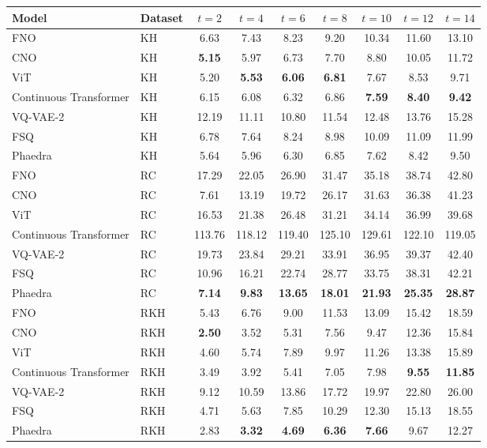 \begin{tabular}{llccccccc}
\toprule
Model & Dataset & $t=2$ & $t=4$ & $t=6$ & $t=8$ & $t=10$ & $t=12$ & $t=14$ \\
\midrule
FNO & KH & 6.63 & 7.43 & 8.23 & 9.20 & 10.34 & 11.60 & 13.10 \\
CNO & KH & \textbf{5.15} & 5.97 & 6.73 & 7.70 & 8.80 & 10.05 & 11.72 \\
ViT & KH & 5.20 & \textbf{5.53} & \textbf{6.06} & \textbf{6.81} & 7.67 & 8.53 & 9.71 \\
Continuous Transformer & KH & 6.15 & 6.08 & 6.32 & 6.86 & \textbf{7.59} & \textbf{8.40} & \textbf{9.42} \\
VQ-VAE-2 & KH & 12.19 & 11.11 & 10.80 & 11.54 & 12.48 & 13.76 & 15.28 \\
FSQ & KH & 6.78 & 7.64 & 8.24 & 8.98 & 10.09 & 11.09 & 11.99 \\
Phaedra & KH & 5.64 & 5.96 & 6.30 & 6.85 & 7.62 & 8.42 & 9.50 \\
\midrule
FNO & RC & 17.29 & 22.05 & 26.90 & 31.47 & 35.18 & 38.74 & 42.80 \\
CNO & RC & 7.61 & 13.19 & 19.72 & 26.17 & 31.63 & 36.38 & 41.23 \\
ViT & RC & 16.53 & 21.38 & 26.48 & 31.21 & 34.14 & 36.99 & 39.68 \\
Continuous Transformer & RC & 113.76 & 118.12 & 119.40 & 125.10 & 129.61 & 122.10 & 119.05 \\
VQ-VAE-2 & RC & 19.73 & 23.84 & 29.21 & 33.91 & 36.95 & 39.37 & 42.40 \\
FSQ & RC & 10.96 & 16.21 & 22.74 & 28.77 & 33.75 & 38.31 & 42.21 \\
Phaedra & RC & \textbf{7.14} & \textbf{9.83} & \textbf{13.65} & \textbf{18.01} & \textbf{21.93} & \textbf{25.35} & \textbf{28.87} \\
\midrule
FNO & RKH & 5.43 & 6.76 & 9.00 & 11.53 & 13.09 & 15.42 & 18.59 \\
CNO & RKH & \textbf{2.50} & 3.52 & 5.31 & 7.56 & 9.47 & 12.36 & 15.84 \\
ViT & RKH & 4.60 & 5.74 & 7.89 & 9.97 & 11.26 & 13.38 & 15.89 \\
Continuous Transformer & RKH & 3.49 & 3.92 & 5.41 & 7.05 & 7.98 & \textbf{9.55} & \textbf{11.85} \\
VQ-VAE-2 & RKH & 9.12 & 10.59 & 13.86 & 17.72 & 19.97 & 22.80 & 26.00 \\
FSQ & RKH & 4.71 & 5.63 & 7.85 & 10.29 & 12.30 & 15.13 & 18.55 \\
Phaedra & RKH & 2.83 & \textbf{3.32} & \textbf{4.69} & \textbf{6.36} & \textbf{7.66} & 9.67 & 12.27 \\
\bottomrule
\end{tabular}
